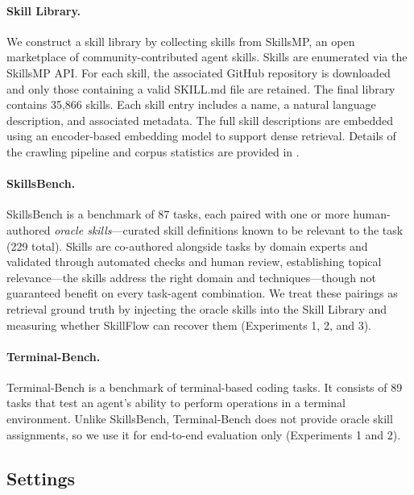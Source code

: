 \documentclass[11pt]{article}
\begin{document}
\paragraph{Skill Library.}
\label{sec:skill_library}
We construct a skill library by collecting skills from SkillsMP, an open marketplace of community-contributed agent skills.
Skills are enumerated via the SkillsMP API. For each skill, the associated GitHub repository is downloaded and only those containing a valid SKILL.md file are retained.
The final library contains 35,866 skills.
Each skill entry includes a name, a natural language description, and associated metadata.
The full skill descriptions are embedded using an encoder-based embedding model to support dense retrieval.
Details of the crawling pipeline and corpus statistics are provided in .

\paragraph{SkillsBench.}
SkillsBench \citep{li_skillsbench_2026} is a benchmark of 87 tasks, each paired with one or more human-authored \emph{oracle skills}---curated skill definitions known to be relevant to the task (229 total).
Skills are co-authored alongside tasks by domain experts and validated through automated checks and human review, establishing topical relevance---the skills address the right domain and techniques---though not guaranteed benefit on every task-agent combination.
We treat these pairings as retrieval ground truth by injecting the oracle skills into the Skill Library and measuring whether SkillFlow can recover them (Experiments 1, 2, and 3).

\paragraph{Terminal-Bench.}
Terminal-Bench \citep{merrill2026terminalbench} is a benchmark of terminal-based coding tasks.
It consists of 89 tasks that test an agent's ability to perform operations in a terminal environment.
Unlike SkillsBench, Terminal-Bench does not provide oracle skill assignments, so we use it for end-to-end evaluation only (Experiments 1 and 2).

\subsection{Settings}
\end{document}
